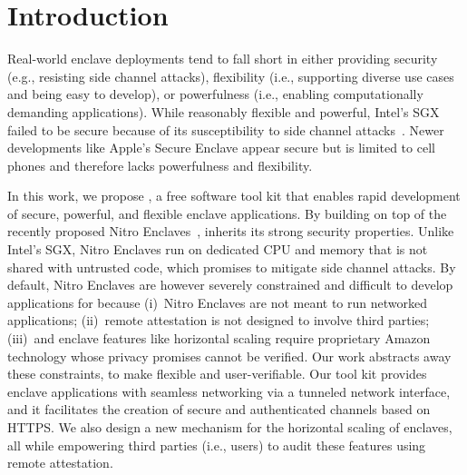\section{Introduction}

Real-world enclave deployments tend to fall short in either providing security
(e.g., resisting side channel attacks), flexibility (i.e., supporting diverse
use cases and being easy to develop), or powerfulness (i.e., enabling
computationally demanding applications).  While reasonably flexible and
powerful, Intel's SGX failed to be secure because of its susceptibility to side
channel attacks~\cite{VanBulck2018a,Murdock2020a,Brasser2017a}.  Newer
developments like Apple's Secure Enclave appear secure but is limited to cell
phones and therefore lacks powerfulness and flexibility.

In this work, we propose \tool{}, a free software tool kit that enables rapid
development of secure, powerful, and flexible enclave applications.  By building
on top of the recently proposed Nitro Enclaves~\cite{nitro-enclaves}, \tool{}
inherits its strong security properties.  Unlike Intel's SGX, Nitro Enclaves run
on dedicated CPU and memory that is not shared with untrusted code, which
promises to mitigate side channel attacks.
%
By default, Nitro Enclaves are however severely constrained and difficult to
develop applications for because (i)~Nitro Enclaves are not meant to run
networked applications; (ii)~remote attestation is not designed to involve third
parties; (iii)~and enclave features like horizontal scaling require proprietary
Amazon technology whose privacy promises cannot be verified.  Our work abstracts
away these constraints, to make \tool{} flexible and user-verifiable.  Our tool
kit provides enclave applications with seamless networking via a tunneled
network interface, and it facilitates the creation of secure and authenticated
channels based on HTTPS.  We also design a new mechanism for the horizontal
scaling of enclaves, all while empowering third parties (i.e., users) to audit
these features using remote attestation.

